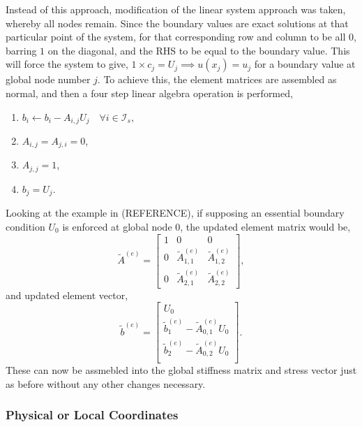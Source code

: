 Instead of this approach, modification of the linear system approach was taken, whereby all nodes remain. Since the boundary values are exact solutions at that particular point of the system, for that corresponding row and column to be all $0$, barring $1$ on the diagonal, and the RHS to be equal to the boundary value. This will force the system to give, $1 \times c_j = U_j \implies u(x_j) = u_j$ for a boundary value at global node number $j$. To achieve this, the element matrices are assembled as normal, and then a four step linear algebra operation is performed,
\begin{enumerate}
	\item $b_i \leftarrow b_i - A_{i,j}U_j\quad\forall i \in \mathcal{I}_s,$
	\item $A_{i,j} = A_{j,i} = 0$,
	\item $A_{j,j} = 1$,
	\item $b_j = U_j$.
\end{enumerate}
Looking at the example in (REFERENCE), if supposing an essential boundary condition $U_0$ is enforced at global node $0$, the updated element matrix would be,
\begin{equation}
	\tilde{A}^{(e)} =
	\left[\begin{matrix} 
		1 & 0 & 0 \\
		0 & \tilde{A}^{(e)}_{1,1} & \tilde{A}^{(e)}_{1,2} \\
		0 & \tilde{A}^{(e)}_{2,1} & \tilde{A}^{(e)}_{2,2}
	\end{matrix}\right],
\end{equation}
and updated element vector,
\begin{equation}
	\tilde{b}^{(e)} =
	\left[\begin{matrix}
		U_0 \\
		\tilde{b}^{(e)}_1 - \tilde{A}^{(e)}_{0,1} U_0 \\
		\tilde{b}^{(e)}_2 -\tilde{A}^{(e)}_{0,2} U_0 \\
	\end{matrix}\right].
\end{equation}
These can now be assmebled into the global stiffness matrix and stress vector just as before without any other changes necessary.

\subsubsection{Physical or Local Coordinates}

